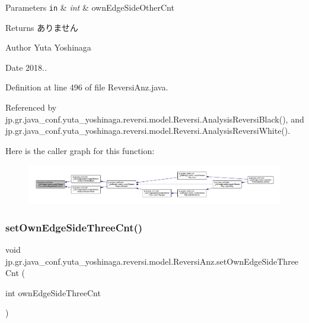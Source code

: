 \begin{DoxyParams}[1]{Parameters}
\mbox{\tt in}  & {\em int} & own\+Edge\+Side\+Other\+Cnt \\
\hline
\end{DoxyParams}
\begin{DoxyReturn}{Returns}
ありません 
\end{DoxyReturn}
\begin{DoxyAuthor}{Author}
Yuta Yoshinaga 
\end{DoxyAuthor}
\begin{DoxyDate}{Date}
2018.. 
\end{DoxyDate}


Definition at line 496 of file Reversi\+Anz.\+java.



Referenced by jp.\+gr.\+java\+\_\+conf.\+yuta\+\_\+yoshinaga.\+reversi.\+model.\+Reversi.\+Analysis\+Reversi\+Black(), and jp.\+gr.\+java\+\_\+conf.\+yuta\+\_\+yoshinaga.\+reversi.\+model.\+Reversi.\+Analysis\+Reversi\+White().

Here is the caller graph for this function\+:
\nopagebreak
\begin{figure}[H]
\begin{center}
\leavevmode
\includegraphics[width=350pt]{classjp_1_1gr_1_1java__conf_1_1yuta__yoshinaga_1_1reversi_1_1model_1_1_reversi_anz_ac636e4020b682188e70e3b983fd3d4e4_icgraph}
\end{center}
\end{figure}
\mbox{\label{classjp_1_1gr_1_1java__conf_1_1yuta__yoshinaga_1_1reversi_1_1model_1_1_reversi_anz_a0ce858afa1508c93ca52c33fa4eb2f32}} 
\subsubsection{\texorpdfstring{set\+Own\+Edge\+Side\+Three\+Cnt()}{setOwnEdgeSideThreeCnt()}}
{\footnotesize\ttfamily void jp.\+gr.\+java\+\_\+conf.\+yuta\+\_\+yoshinaga.\+reversi.\+model.\+Reversi\+Anz.\+set\+Own\+Edge\+Side\+Three\+Cnt (\begin{DoxyParamCaption}\item[{int}]{own\+Edge\+Side\+Three\+Cnt }\end{DoxyParamCaption})}



